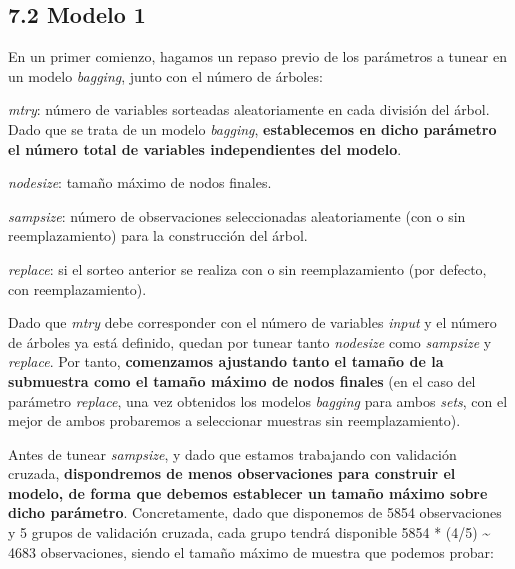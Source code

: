 \documentclass[
]{article}
\begin{document}
\hypertarget{modelo-1}{%
\subsection{7.2 Modelo 1}\label{modelo-1}}

En un primer comienzo, hagamos un repaso previo de los parámetros a
tunear en un modelo \emph{bagging}, junto con el número de árboles:

\emph{mtry}: número de variables sorteadas aleatoriamente en cada
división del árbol. Dado que se trata de un modelo \emph{bagging},
\textbf{establecemos en dicho parámetro el número total de variables
independientes del modelo}.

\emph{nodesize}: tamaño máximo de nodos finales.

\emph{sampsize}: número de observaciones seleccionadas aleatoriamente
(con o sin reemplazamiento) para la construcción del árbol.

\emph{replace}: si el sorteo anterior se realiza con o sin
reemplazamiento (por defecto, con reemplazamiento).

Dado que \emph{mtry} debe corresponder con el número de variables
\emph{input} y el número de árboles ya está definido, quedan por tunear
tanto \emph{nodesize} como \emph{sampsize} y \emph{replace}. Por tanto,
\textbf{comenzamos ajustando tanto el tamaño de la submuestra como el
tamaño máximo de nodos finales} (en el caso del parámetro
\emph{replace}, una vez obtenidos los modelos \emph{bagging} para ambos
\emph{sets}, con el mejor de ambos probaremos a seleccionar muestras sin
reemplazamiento).

Antes de tunear \emph{sampsize}, y dado que estamos trabajando con
validación cruzada, \textbf{dispondremos de menos observaciones para
construir el modelo, de forma que debemos establecer un tamaño máximo
sobre dicho parámetro}. Concretamente, dado que disponemos de 5854
observaciones y 5 grupos de validación cruzada, cada grupo tendrá
disponible 5854 * (4/5) \textasciitilde{} 4683 observaciones, siendo el
tamaño máximo de muestra que podemos probar:
\end{document}
